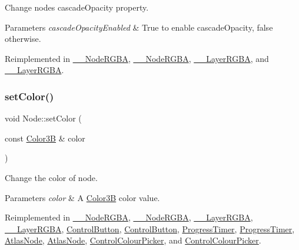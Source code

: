 Change node\textquotesingle{}s cascade\+Opacity property. 
\begin{DoxyParams}{Parameters}
{\em cascade\+Opacity\+Enabled} & True to enable cascade\+Opacity, false otherwise. \\
\hline
\end{DoxyParams}


Reimplemented in \hyperlink{class____NodeRGBA_a10fe85e705700fbe2bd28da1a17eda68}{\+\_\+\+\_\+\+Node\+R\+G\+BA}, \hyperlink{class____NodeRGBA_a10fe85e705700fbe2bd28da1a17eda68}{\+\_\+\+\_\+\+Node\+R\+G\+BA}, \hyperlink{class____LayerRGBA_ab25a8418f19d14a064f8c8072b3468a5}{\+\_\+\+\_\+\+Layer\+R\+G\+BA}, and \hyperlink{class____LayerRGBA_ab25a8418f19d14a064f8c8072b3468a5}{\+\_\+\+\_\+\+Layer\+R\+G\+BA}.

\mbox{\label{classNode_af45037de5b13602263b1ce51b50cafdd}} 
\subsubsection{\texorpdfstring{set\+Color()}{setColor()}\hspace{0.1cm}{\footnotesize\ttfamily [1/2]}}
{\footnotesize\ttfamily void Node\+::set\+Color (\begin{DoxyParamCaption}\item[{const \hyperlink{structColor3B}{Color3B} \&}]{color }\end{DoxyParamCaption})\hspace{0.3cm}{\ttfamily [virtual]}}

Change the color of node. 
\begin{DoxyParams}{Parameters}
{\em color} & A \hyperlink{structColor3B}{Color3B} color value. \\
\hline
\end{DoxyParams}


Reimplemented in \hyperlink{class____NodeRGBA_adaec184f0ee740557ffddaece7ece996}{\+\_\+\+\_\+\+Node\+R\+G\+BA}, \hyperlink{class____NodeRGBA_adaec184f0ee740557ffddaece7ece996}{\+\_\+\+\_\+\+Node\+R\+G\+BA}, \hyperlink{class____LayerRGBA_aed346ddd9f7f7eab1e3d1417fa9a9831}{\+\_\+\+\_\+\+Layer\+R\+G\+BA}, \hyperlink{class____LayerRGBA_aed346ddd9f7f7eab1e3d1417fa9a9831}{\+\_\+\+\_\+\+Layer\+R\+G\+BA}, \hyperlink{classControlButton_ade75d696a57fbe334ee40152aa2f4bc8}{Control\+Button}, \hyperlink{classControlButton_a7a6e29777bb4a89dab5ac436d92287ac}{Control\+Button}, \hyperlink{classProgressTimer_a3cd315f15a68b541ab276648fa5803cf}{Progress\+Timer}, \hyperlink{classProgressTimer_aabc06a02c225d876ac5746dc6561949f}{Progress\+Timer}, \hyperlink{classAtlasNode_a4205343f55700284ffba22a2988c5445}{Atlas\+Node}, \hyperlink{classAtlasNode_a67a26fd695101fe4efa0533cb3dc9f39}{Atlas\+Node}, \hyperlink{classControlColourPicker_a23536124c2fbdad9fb93b0de8bf9b85e}{Control\+Colour\+Picker}, and \hyperlink{classControlColourPicker_af83da2a45dd64f202132830729711513}{Control\+Colour\+Picker}.

